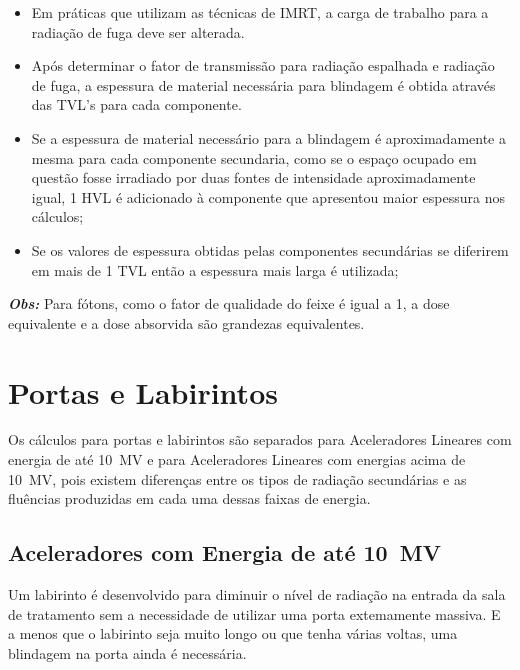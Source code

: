 \documentclass[11pt,a4paper]{article}
\begin{document}
            \begin{itemize}
                \item Em práticas que utilizam as técnicas de IMRT, a carga de trabalho para a radiação de fuga deve ser alterada.
                
                \item Após determinar o fator de transmissão para radiação espalhada e radiação de fuga, a espessura de material necessária para blindagem é obtida através das TVL's para cada componente.
                
                \item Se a espessura de material necessário para a blindagem é aproximadamente a mesma para cada componente secundaria, como se o espaço ocupado em questão fosse irradiado por duas fontes de intensidade aproximadamente igual,  1 HVL é adicionado à componente que apresentou maior espessura nos cálculos;
                
                \item Se os valores de espessura obtidas pelas componentes secundárias se diferirem em mais de 1 TVL então a espessura mais larga é utilizada;
            \end{itemize}

        
        
            \textbf{\textit{\textcolor{CarnationPink}{Obs:}}} Para fótons, como o fator de qualidade do feixe é igual a 1, a dose equivalente e a dose absorvida são grandezas equivalentes. 
            
        
        \section{Portas e Labirintos}

            Os cálculos para portas e labirintos são separados para Aceleradores Lineares com energia de até \qty{10}{MV} e para Aceleradores Lineares com energias acima de \qty{10}{MV}, pois existem diferenças entre os tipos de radiação secundárias e as fluências produzidas em cada uma dessas faixas de energia.

        \subsection{Aceleradores com Energia de até \qty{10}{MV}}
            

            Um labirinto é desenvolvido para diminuir o nível de radiação na entrada da sala de tratamento sem a necessidade de utilizar uma porta extemamente massiva. E a menos que o labirinto seja muito longo ou que tenha várias voltas, uma blindagem na porta ainda é necessária.
\end{document}
